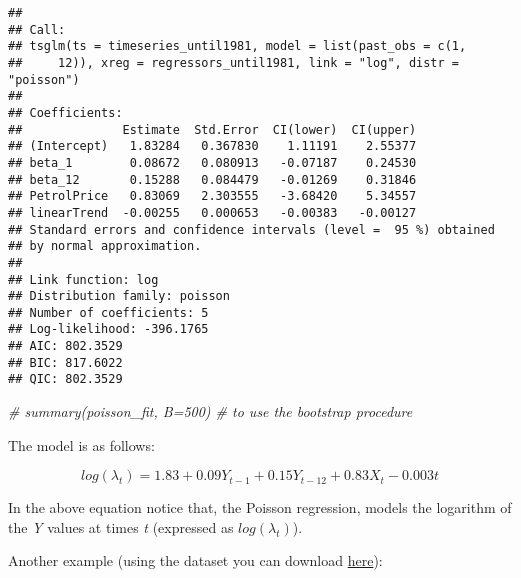 \documentclass[
]{article}
\newenvironment{Shaded}{\begin{snugshade}}{\end{snugshade}}
\newcommand{\CommentTok}[1]{\textcolor[rgb]{0.56,0.35,0.01}{\textit{#1}}}
\begin{document}
\begin{verbatim}
## 
## Call:
## tsglm(ts = timeseries_until1981, model = list(past_obs = c(1, 
##     12)), xreg = regressors_until1981, link = "log", distr = "poisson")
## 
## Coefficients:
##              Estimate  Std.Error  CI(lower)  CI(upper)
## (Intercept)   1.83284   0.367830    1.11191    2.55377
## beta_1        0.08672   0.080913   -0.07187    0.24530
## beta_12       0.15288   0.084479   -0.01269    0.31846
## PetrolPrice   0.83069   2.303555   -3.68420    5.34557
## linearTrend  -0.00255   0.000653   -0.00383   -0.00127
## Standard errors and confidence intervals (level =  95 %) obtained
## by normal approximation.
## 
## Link function: log 
## Distribution family: poisson 
## Number of coefficients: 5 
## Log-likelihood: -396.1765 
## AIC: 802.3529 
## BIC: 817.6022 
## QIC: 802.3529
\end{verbatim}

\begin{Shaded}
\begin{Highlighting}[]
\CommentTok{\# summary(poisson\_fit, B=500) \# to use the bootstrap procedure}
\end{Highlighting}
\end{Shaded}

The model is as follows:

\[
log(\lambda_t) = 1.83 + 0.09Y_{t-1} + 0.15Y_{t-12} + 0.83X_t - 0.003t
\]

In the above equation notice that, the Poisson regression, models the logarithm of the \emph{Y} values at times \emph{t} (expressed as \(log(\lambda_t)\)).

Another example (using the dataset you can download \href{https://drive.google.com/file/d/1eIOERBLCUCaap3WCoM5QT6I0iTW-Hqwa/view?usp=sharing}{here}):
\end{document}
